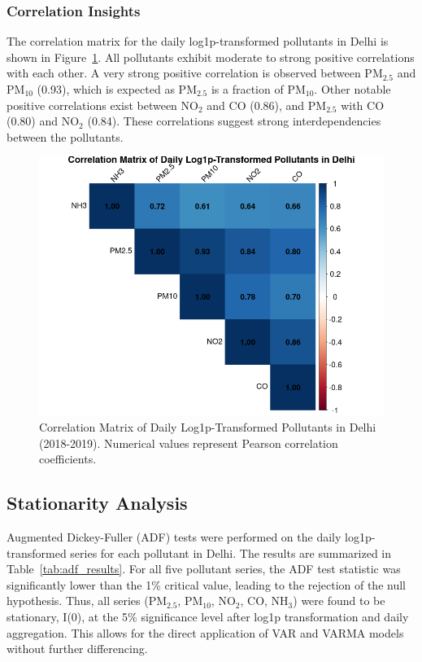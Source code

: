 \documentclass[fleqn,10pt]{SelfArx} %
\begin{document}
\subsubsection{Correlation Insights}
The correlation matrix for the daily log1p-transformed pollutants in Delhi is shown in Figure~\ref{fig:corrplot_delhi}. All pollutants exhibit moderate to strong positive correlations with each other. A very strong positive correlation is observed between $\text{PM}_{2.5}$ and $\text{PM}_{10}$ (0.93), which is expected as $\text{PM}_{2.5}$ is a fraction of $\text{PM}_{10}$. Other notable positive correlations exist between $\text{NO}_2$ and CO (0.86), and $\text{PM}_{2.5}$ with CO (0.80) and $\text{NO}_2$ (0.84). These correlations suggest strong interdependencies between the pollutants.

\begin{figure}[ht]
    \centering
    \includegraphics[width=0.8\linewidth]{../analysis/assets/corrplot_delhi.png}
    \caption{Correlation Matrix of Daily Log1p-Transformed Pollutants in Delhi (2018-2019). Numerical values represent Pearson correlation coefficients.}
    \label{fig:corrplot_delhi}
\end{figure}

\subsection{Stationarity Analysis}
Augmented Dickey-Fuller (ADF) tests were performed on the daily log1p-transformed series for each pollutant in Delhi. The results are summarized in Table~\ref{tab:adf_results}.
For all five pollutant series, the ADF test statistic was significantly lower than the 1\% critical value, leading to the rejection of the null hypothesis. Thus, all series ($\text{PM}_{2.5}$, $\text{PM}_{10}$, $\text{NO}_2$, CO, $\text{NH}_3$) were found to be stationary, I(0), at the 5\% significance level after log1p transformation and daily aggregation. This allows for the direct application of VAR and VARMA models without further differencing.
\end{document}
